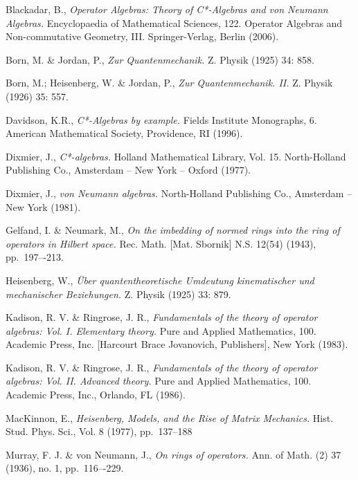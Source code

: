 \documentclass[12pt,a4paper]{report}
\theoremstyle{plain}
\theoremstyle{definition}
\newcommand{\1}{\mathbbm{1}}
\begin{document}
\begin{thebibliography}{00}
	Blackadar, B.,
	\emph{Operator Algebras: Theory of C*-Algebras and von Neumann Algebras.}
	Encyclopaedia of Mathematical Sciences, 122. Operator Algebras and Non-commutative Geometry, III. 
	Springer-Verlag, Berlin (2006).
	
	Born, M. \& Jordan, P.,
	\emph{Zur Quantenmechanik.}
	Z. Physik (1925) 34: 858.
	
	Born, M.; Heisenberg, W. \& Jordan, P.,
	\emph{Zur Quantenmechanik. II.}
	Z. Physik (1926) 35: 557.

	Davidson, K.R.,
	\emph{C*-Algebras by example.}
	Fields Institute Monographs, 6. American Mathematical Society, Providence, RI (1996).

	Dixmier, J.,
	\emph{C*-algebras.}
	Holland Mathematical Library, Vol. 15. North-Holland Publishing Co., Amsterdam -- New York -- Oxford 
	(1977).

	Dixmier, J.,
	\emph{von Neumann algebras.}
	North-Holland Publishing Co., Amsterdam -- New York (1981).

	Gelfand, I. \& Neumark, M.,
	\emph{On the imbedding of normed rings into the ring of operators in Hilbert space.}
	Rec. Math. [Mat. Sbornik] N.S. 12(54) (1943), pp.~197–-213.

	Heisenberg, W.,
	\emph{{\"U}ber quantentheoretische Umdeutung kinematischer und mechanischer Beziehungen.}
	Z. Physik (1925) 33: 879. 
	
	Kadison, R. V. \& Ringrose, J. R.,
	\emph{Fundamentals of the theory of operator algebras: Vol. I. Elementary theory.}
	Pure and Applied Mathematics, 100. Academic Press, Inc. [Harcourt Brace Jovanovich, Publishers], New 
	York (1983).

	Kadison, R. V. \& Ringrose, J. R.,
	\emph{Fundamentals of the theory of operator algebras: Vol. II. Advanced theory.}
	Pure and Applied Mathematics, 100. Academic Press, Inc., Orlando, FL (1986).

	MacKinnon, E.,
	\emph{Heisenberg, Models, and the Rise of Matrix Mechanics.}
	Hist. Stud. Phys. Sci., Vol. 8 (1977), pp.~137--188
	
	Murray, F. J. \& von Neumann, J.,
	\emph{On rings of operators.}
	Ann. of Math. (2) 37 (1936), no. 1, pp.~116–-229.


\end{thebibliography}
\end{document}
